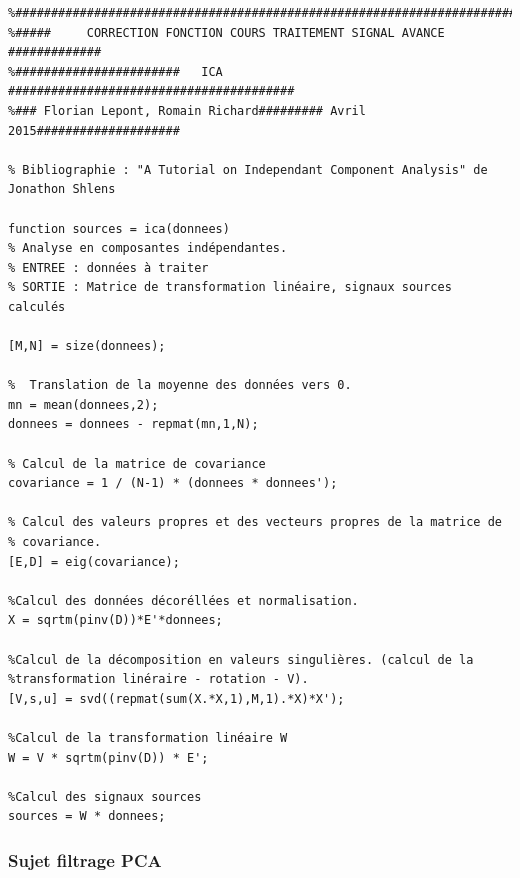 \begin{verbatim}
%##########################################################################
%#####     CORRECTION FONCTION COURS TRAITEMENT SIGNAL AVANCE #############
%#######################   ICA     ########################################
%### Florian Lepont, Romain Richard######### Avril 2015####################

% Bibliographie : "A Tutorial on Independant Component Analysis" de Jonathon Shlens

function sources = ica(donnees)
% Analyse en composantes indépendantes.
% ENTREE : données à traiter
% SORTIE : Matrice de transformation linéaire, signaux sources calculés

[M,N] = size(donnees);

%  Translation de la moyenne des données vers 0.
mn = mean(donnees,2);
donnees = donnees - repmat(mn,1,N);

% Calcul de la matrice de covariance
covariance = 1 / (N-1) * (donnees * donnees');

% Calcul des valeurs propres et des vecteurs propres de la matrice de
% covariance.
[E,D] = eig(covariance);

%Calcul des données décoréllées et normalisation.
X = sqrtm(pinv(D))*E'*donnees;

%Calcul de la décomposition en valeurs singulières. (calcul de la
%transformation linéraire - rotation - V).
[V,s,u] = svd((repmat(sum(X.*X,1),M,1).*X)*X');

%Calcul de la transformation linéaire W
W = V * sqrtm(pinv(D)) * E';

%Calcul des signaux sources
sources = W * donnees;
\end{verbatim}


\newpage
\subsubsection{Sujet filtrage PCA}

